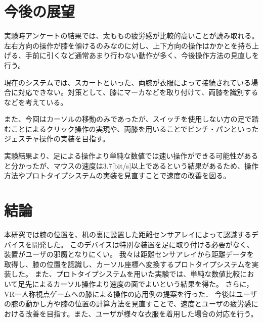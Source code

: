 \documentclass[submit, techrep]{ipsj}
\begin{document}

\section{今後の展望}
実験時アンケートの結果では、太ももの疲労感が比較的高いことが読み取れる。左右方向の操作が膝を傾けるのみなのに対し、上下方向の操作はかかとを持ち上げる、手前に引くなど通常あまり行わない動作が多く、今後操作方法の見直しを行う。\par
現在のシステムでは、スカートといった、両膝が衣服によって接続されている場合に対応できない。対策として、膝にマーカなどを取り付けて、両膝を識別するなどを考えている。\par
また、今回はカーソルの移動のみであったが、スイッチを使用しない方の足で踏むことによるクリック操作の実現や、両膝を用いることでピンチ・パンといったジェスチャ操作の実装を目指す。\par
実験結果より、足による操作より単純な数値では速い操作ができる可能性があると分かったが、マウスの速度は3.7[bit/s]以上\cite{Soukoreff:2004:TSP:1056153.1056155}であるという結果があるため、操作方法やプロトタイプシステムの実装を見直すことで速度の改善を図る。

\section{結論}
本研究では膝の位置を、机の裏に設置した距離センサアレイによって認識するデバイスを開発した。
このデバイスは特別な装置を足に取り付ける必要がなく、装置がユーザの邪魔となりにくい。
我々は距離センサアレイから距離データを取得し、膝の位置を認識し、カーソル座標へ変換するプロトタイプシステムを実装した。
また、プロトタイプシステムを用いた実験では、単純な数値比較において足先によるカーソル操作より速度の面でよいという結果を得た。
さらに，VR一人称視点ゲームへの膝による操作の応用例の提案を行った．
今後はユーザの膝の動かし方や膝の位置の計算方法を見直すことで、速度とユーザの疲労感における改善を目指す。また、ユーザが様々な衣服を着用した場合の対応を行う。
\end{document}

